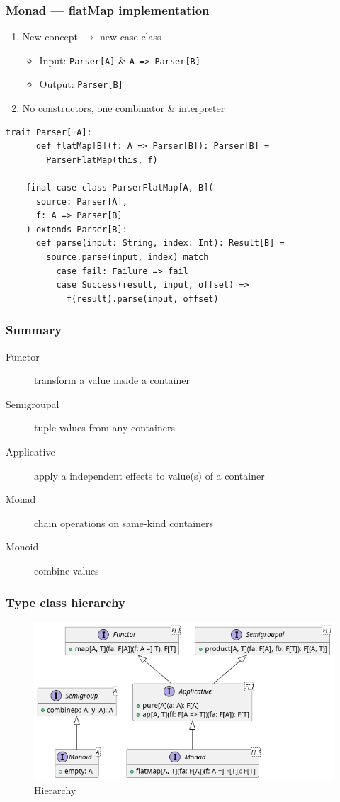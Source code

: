 \begin{frame}[fragile]
  \frametitle{Monad --- flatMap implementation}

  \begin{enumerate}
    \item New concept \({\rightarrow}\) new case class
          \begin{itemize}
            \item Input: \texttt{Parser[A]} \& \texttt{A => Parser[B]}
            \item Output: \texttt{Parser[B]}
          \end{itemize}
    \item No constructors, one combinator \& interpreter
  \end{enumerate}

  \begin{lstlisting}[gobble=4]
    trait Parser[+A]:
      def flatMap[B](f: A => Parser[B]): Parser[B] =
        ParserFlatMap(this, f)

    final case class ParserFlatMap[A, B](
      source: Parser[A],
      f: A => Parser[B]
    ) extends Parser[B]:
      def parse(input: String, index: Int): Result[B] =
        source.parse(input, index) match
          case fail: Failure => fail
          case Success(result, input, offset) =>
            f(result).parse(input, offset)
  \end{lstlisting}

\end{frame}

\begin{frame}
  \frametitle{Summary}

  \begin{description}
    \item[Functor] transform a value inside a container
    \item[Semigroupal] tuple values from any containers
    \item[Applicative] apply a independent effects to value(s) of a container
    \item[Monad] chain operations on same-kind containers
    \item[Monoid] combine values
  \end{description}
\end{frame}

\begin{frame}[fragile]
  \frametitle{Type class hierarchy}

  \begin{figure}[h]
    \centering
    \includegraphics[width=0.9\linewidth]{img/tc-hierarchy.png}
    \caption{Hierarchy}
  \end{figure}
\end{frame}